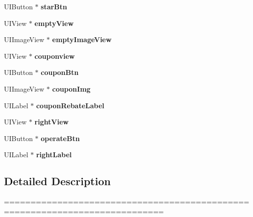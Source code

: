 \begin{DoxyCompactItemize}
U\+I\+Button $\ast$ {\bfseries star\+Btn}
\item 
\mbox{\label{category_j_m_home_product_cell_07_08_aa6cb87418234ed81f94bc582768ef761}} 
U\+I\+View $\ast$ {\bfseries empty\+View}
\item 
\mbox{\label{category_j_m_home_product_cell_07_08_aa7cd766318953d9ffd6a921c03c66129}} 
U\+I\+Image\+View $\ast$ {\bfseries empty\+Image\+View}
\item 
\mbox{\label{category_j_m_home_product_cell_07_08_ac81e144a64beaf4be5a1c698143f92a0}} 
U\+I\+View $\ast$ {\bfseries couponview}
\item 
\mbox{\label{category_j_m_home_product_cell_07_08_a05d6cd53a3ea41affb20d924892fef36}} 
U\+I\+Button $\ast$ {\bfseries coupon\+Btn}
\item 
\mbox{\label{category_j_m_home_product_cell_07_08_abee6be47ecc743a9fa481b365456062c}} 
U\+I\+Image\+View $\ast$ {\bfseries coupon\+Img}
\item 
\mbox{\label{category_j_m_home_product_cell_07_08_a9e8aa99e0612112492d0c3508349293a}} 
U\+I\+Label $\ast$ {\bfseries coupon\+Rebate\+Label}
\item 
\mbox{\label{category_j_m_home_product_cell_07_08_a449f8e4280b0ee4c96754d68c5cda4d5}} 
U\+I\+View $\ast$ {\bfseries right\+View}
\item 
\mbox{\label{category_j_m_home_product_cell_07_08_a0f799b66d813d8327bd396383a8b1384}} 
U\+I\+Button $\ast$ {\bfseries operate\+Btn}
\item 
\mbox{\label{category_j_m_home_product_cell_07_08_aa4b56d8fdd1baaa6f3faa9fbc20bfa63}} 
U\+I\+Label $\ast$ {\bfseries right\+Label}
\end{DoxyCompactItemize}


\subsection{Detailed Description}
============================================================================


